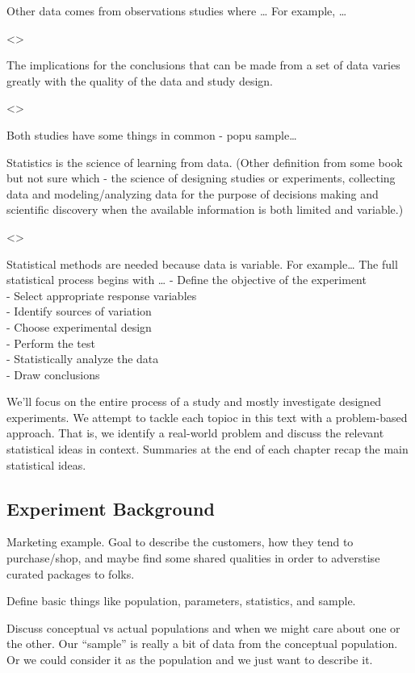 \documentclass[]{book}
\theoremstyle{definition}
\theoremstyle{definition}
\theoremstyle{definition}
\theoremstyle{remark}
\begin{document}
Other data comes from observations studies where \ldots{} For example,
\ldots{}

\textless{}\textgreater{}

The implications for the conclusions that can be made from a set of data
varies greatly with the quality of the data and study design.

\textless{}\textgreater{}

Both studies have some things in common - popu sample\ldots{}

Statistics is the science of learning from data. (Other definition from
some book but not sure which - the science of designing studies or
experiments, collecting data and modeling/analyzing data for the purpose
of decisions making and scientific discovery when the available
information is both limited and variable.)

\textless{}\textgreater{}

Statistical methods are needed because data is variable. For
example\ldots{} The full statistical process begins with \ldots{} -
Define the objective of the experiment\\
- Select appropriate response variables\\
- Identify sources of variation\\
- Choose experimental design\\
- Perform the test\\
- Statistically analyze the data\\
- Draw conclusions

We'll focus on the entire process of a study and mostly investigate
designed experiments. We attempt to tackle each topioc in this text with
a problem-based approach. That is, we identify a real-world problem and
discuss the relevant statistical ideas in context. Summaries at the end
of each chapter recap the main statistical ideas.

\subsection{Experiment Background}\label{experiment-background}

Marketing example. Goal to describe the customers, how they tend to
purchase/shop, and maybe find some shared qualities in order to
adverstise curated packages to folks.

Define basic things like population, parameters, statistics, and sample.

Discuss conceptual vs actual populations and when we might care about
one or the other. Our ``sample'' is really a bit of data from the
conceptual population. Or we could consider it as the population and we
just want to describe it.
\end{document}
